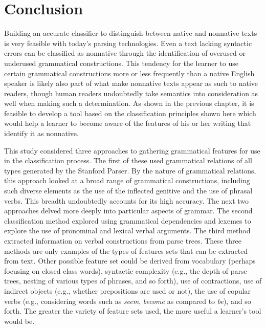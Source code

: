 \documentclass[main.tex]{subfiles}
\begin{document}
\section{Conclusion}

Building an accurate classifier to distinguish between native and nonnative texts is very feasible with today's parsing technologies. Even a text lacking syntactic errors can be classified as nonnative through the identification of overused or underused grammatical constructions. This tendency for the learner to use certain grammatical constructions more or less frequently than a native English speaker is likely also part of what make nonnative texts appear as such to native readers, though human readers undoubtedly take semantics into consideration as well when making such a determination. As shown in the previous chapter, it is feasible to develop a tool based on the classification principles shown here which would help a learner to become aware of the features of his or her writing that identify it as nonnative.

This study considered three approaches to gathering grammatical features for use in the classification process. The first of these used grammatical relations of all types generated by the Stanford Parser. By the nature of grammatical relations, this approach looked at a broad range of grammatical constructions, including such diverse elements as the use of the inflected genitive and the use of phrasal verbs. This breadth undoubtedly accounts for its high accuracy. The next two approaches delved more deeply into particular aspects of grammar. The second classification method explored using grammatical dependencies and lexemes to explore the use of pronominal and lexical verbal arguments. The third method extracted information on verbal constructions from parse trees. These three methods are only examples of the types of features sets that can be extracted from text. Other possible feature set could be derived from vocabulary (perhaps focusing on closed class words), syntactic complexity (e.g., the depth of parse trees, nesting of various types of phrases, and so forth), use of contractions, use of indirect objects (e.g., whether prepositions are used or not), the use of copular verbs (e.g., considering words such as \textit{seem}, \textit{become} as compared to \textit{be}), and so forth. The greater the variety of feature sets used, the more useful a learner's tool would be.



\biblio
\end{document}
